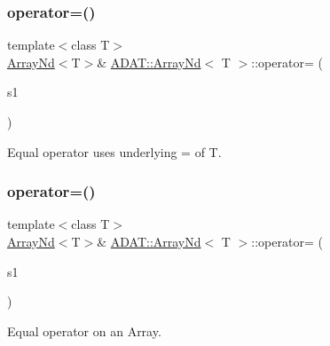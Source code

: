 \subsubsection{\texorpdfstring{operator=()}{operator=()}\hspace{0.1cm}{\footnotesize\ttfamily [3/15]}}
{\footnotesize\ttfamily template$<$class T$>$ \\
\mbox{\hyperlink{classADAT_1_1ArrayNd}{Array\+Nd}}$<$T$>$\& \mbox{\hyperlink{classADAT_1_1ArrayNd}{A\+D\+A\+T\+::\+Array\+Nd}}$<$ T $>$\+::operator= (\begin{DoxyParamCaption}\item[{const \mbox{\hyperlink{classADAT_1_1ArrayNd}{Array\+Nd}}$<$ T $>$ \&}]{s1 }\end{DoxyParamCaption})\hspace{0.3cm}{\ttfamily [inline]}}



Equal operator uses underlying = of T. 

\mbox{\label{classADAT_1_1ArrayNd_a3290ebbe75b40ebde8f3506f2aea64a5}} 
\subsubsection{\texorpdfstring{operator=()}{operator=()}\hspace{0.1cm}{\footnotesize\ttfamily [4/15]}}
{\footnotesize\ttfamily template$<$class T$>$ \\
\mbox{\hyperlink{classADAT_1_1ArrayNd}{Array\+Nd}}$<$T$>$\& \mbox{\hyperlink{classADAT_1_1ArrayNd}{A\+D\+A\+T\+::\+Array\+Nd}}$<$ T $>$\+::operator= (\begin{DoxyParamCaption}\item[{const \mbox{\hyperlink{classXMLArray_1_1Array}{Array}}$<$ T $>$ \&}]{s1 }\end{DoxyParamCaption})\hspace{0.3cm}{\ttfamily [inline]}}



Equal operator on an Array. 

\mbox{\label{classADAT_1_1ArrayNd_a3290ebbe75b40ebde8f3506f2aea64a5}} 
